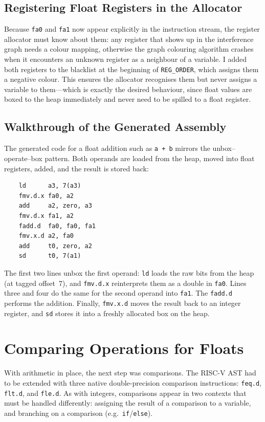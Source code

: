 \subsection{Registering Float Registers in the Allocator}

Because \texttt{fa0} and \texttt{fa1} now appear explicitly in the instruction stream, the register allocator must know about them: any register that shows up in the interference graph needs a colour mapping, otherwise the graph colouring algorithm crashes when it encounters an unknown register as a neighbour of a variable. I added both registers to the blacklist at the beginning of \texttt{REG\_ORDER}, which assigns them a negative colour. This ensures the allocator recognises them but never assigns a variable to them---which is exactly the desired behaviour, since float values are boxed to the heap immediately and never need to be spilled to a float register.

\subsection{Walkthrough of the Generated Assembly}

The generated code for a float addition such as \texttt{a + b} mirrors the unbox--operate--box pattern. Both operands are loaded from the heap, moved into float registers, added, and the result is stored back:

\begin{lstlisting}
    ld      a3, 7(a3)
    fmv.d.x fa0, a2
    add     a2, zero, a3
    fmv.d.x fa1, a2
    fadd.d  fa0, fa0, fa1
    fmv.x.d a2, fa0
    add     t0, zero, a2
    sd      t0, 7(a1)
\end{lstlisting}

The first two lines unbox the first operand: \texttt{ld} loads the raw bits from the heap (at tagged offset~7), and \texttt{fmv.d.x} reinterprets them as a double in \texttt{fa0}. Lines three and four do the same for the second operand into \texttt{fa1}. The \texttt{fadd.d} performs the addition. Finally, \texttt{fmv.x.d} moves the result back to an integer register, and \texttt{sd} stores it into a freshly allocated box on the heap.


\section{Comparing Operations for Floats}

With arithmetic in place, the next step was comparisons. The RISC-V AST had to be extended with three native double-precision comparison instructions: \texttt{feq.d}, \texttt{flt.d}, and \texttt{fle.d}. As with integers, comparisons appear in two contexts that must be handled differently: assigning the result of a comparison to a variable, and branching on a comparison (e.g.\ \texttt{if}/\texttt{else}).

